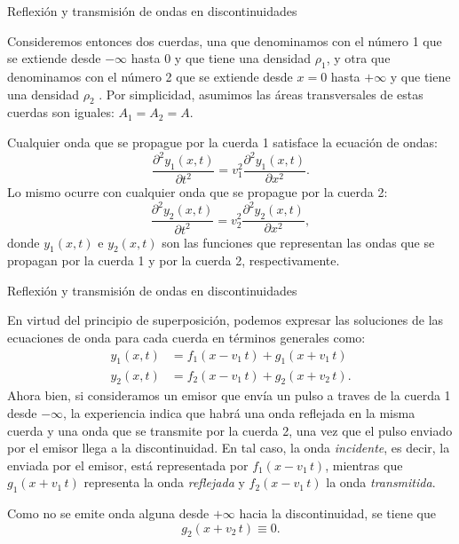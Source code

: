 \documentclass[11pt,handout,aspectratio=1610]{beamer}
\newcommand{\pddiff}[2]{\frac{\partial^2 #1}{\partial #2^2}}
\newcommand{\vs}{\vspace{11pt}}
\begin{document}
\begin{frame}{Reflexión y transmisión de ondas en discontinuidades}

    Consideremos entonces dos cuerdas, una que denominamos con el número 1 que se extiende desde $-\infty$ hasta $0$ y que tiene una densidad $\rho_1$, y otra que denominamos con el número 2 que se extiende desde $x=0$ hasta $+\infty$ y que tiene una densidad $\rho_2$ . Por simplicidad, asumimos las áreas transversales de estas cuerdas son iguales: $A_1 = A_2 = A$.

    \vs

    Cualquier onda que se propague por la cuerda 1 satisface la ecuación de ondas: $$ \pddiff{y_1 \left(x,t\right)}{t} = v_1^2 \pddiff{y_1 \left(x,t\right)}{x}. $$ Lo mismo ocurre con cualquier onda que se propague por la cuerda 2: $$ \pddiff{y_2 \left(x,t\right)}{t} = v_2^2 \pddiff{y_2 \left(x,t\right)}{x}, $$ donde $y_1 \left(x,t\right)$ e $y_2 \left(x,t\right)$ son las funciones que representan las ondas que se propagan por la cuerda 1 y por la cuerda 2, respectivamente.

\end{frame}

\begin{frame}{Reflexión y transmisión de ondas en discontinuidades}

    En virtud del principio de superposición, podemos expresar las soluciones de las ecuaciones de onda para cada cuerda en términos generales como: 
    \begin{align*}
        y_1 \left(x,t\right) &= f_1 \left(x - v_1 \, t\right) + g_1 \left(x + v_1 \, t \right) \\
        y_2 \left(x,t\right) &= f_2 \left(x - v_1 \, t\right) + g_2 \left(x + v_2 \, t \right).
    \end{align*} Ahora bien, si consideramos un emisor que envía un pulso a traves de la cuerda 1 desde $-\infty$, la experiencia indica que habrá una onda reflejada en la misma cuerda y una onda que se transmite por la cuerda 2, una vez que el pulso enviado por el emisor llega a la discontinuidad. En tal caso, la onda \emph{incidente}, es decir, la enviada por el emisor, está representada por $f_1 \left(x - v_1 \, t\right)$, mientras que $g_1 \left(x + v_1 \, t \right)$ representa la onda \emph{reflejada} y $ f_2 \left(x - v_1 \, t\right) $ la onda \emph{transmitida}.

    \vs 

    Como no se emite onda alguna desde $+\infty$ hacia la discontinuidad, se tiene que $$ g_2 \left(x + v_2 \, t \right) \equiv 0. $$

\end{frame}
\end{document}
